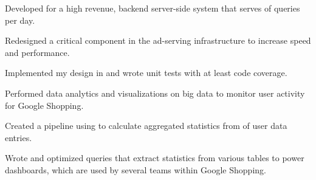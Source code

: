 \documentclass[letterpaper]{deedy-resume} %
\begin{document}
\begin{minipage}[t]{\textwidth}
\sectionspace
\addmarginbetween


\vspace{2mm}
\color{black}
\fontsize{9pt}{9pt}
\begin{tightitemize}
\item Developed for a high revenue, backend server-side system that serves  of queries per day.
\item Redesigned a critical component in the ad-serving infrastructure to increase speed and performance.
\item Implemented my design in  and wrote unit tests with at least  code coverage.
\end{tightitemize}

\sectionspace
\addmarginbetween


\vspace{2mm}
\color{black}
\fontsize{9pt}{9pt}
\begin{tightitemize}
\item Performed data analytics and visualizations on big data to monitor user activity for Google Shopping.
\item Created a  pipeline using  to calculate aggregated statistics from  of user data entries.
\item Wrote and optimized  queries that extract statistics from various tables to power dashboards, which are used by several teams within Google Shopping.
\end{tightitemize}

\sectionspace
\vspace{-5mm}


\\
\\
\vspace{-10pt}


\end{minipage}
\end{document}
